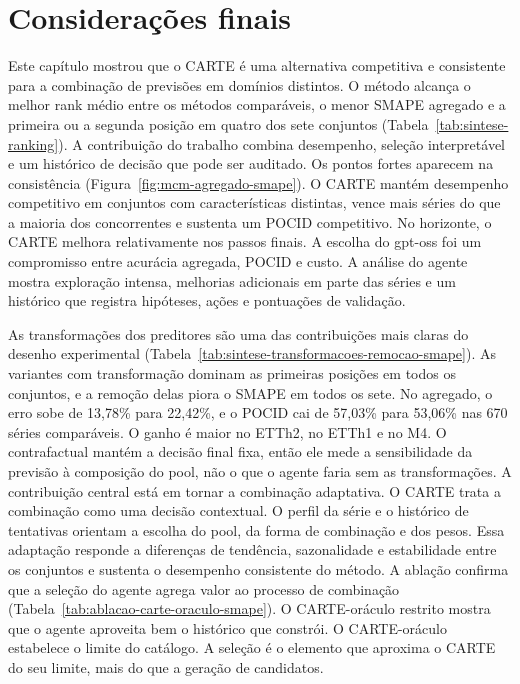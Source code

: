 \section{Considerações finais}
Este capítulo mostrou que o CARTE é uma alternativa competitiva e consistente para a combinação de previsões em domínios distintos. O método alcança o melhor rank médio entre os métodos comparáveis, o menor SMAPE agregado e a primeira ou a segunda posição em quatro dos sete conjuntos (Tabela~\ref{tab:sintese-ranking}). A contribuição do trabalho combina desempenho, seleção interpretável e um histórico de decisão que pode ser auditado. Os pontos fortes aparecem na consistência (Figura~\ref{fig:mcm-agregado-smape}). O CARTE mantém desempenho competitivo em conjuntos com características distintas, vence mais séries do que a maioria dos concorrentes e sustenta um POCID competitivo. No horizonte, o CARTE melhora relativamente nos passos finais. A escolha do gpt-oss foi um compromisso entre acurácia agregada, POCID e custo. A análise do agente mostra exploração intensa, melhorias adicionais em parte das séries e um histórico que registra hipóteses, ações e pontuações de validação.

As transformações dos preditores são uma das contribuições mais claras do desenho experimental (Tabela~\ref{tab:sintese-transformacoes-remocao-smape}). As variantes com transformação dominam as primeiras posições em todos os conjuntos, e a remoção delas piora o SMAPE em todos os sete. No agregado, o erro sobe de 13,78\% para 22,42\%, e o POCID cai de 57,03\% para 53,06\% nas 670 séries comparáveis. O ganho é maior no ETTh2, no ETTh1 e no M4. O contrafactual mantém a decisão final fixa, então ele mede a sensibilidade da previsão à composição do pool, não o que o agente faria sem as transformações. A contribuição central está em tornar a combinação adaptativa. O CARTE trata a combinação como uma decisão contextual. O perfil da série e o histórico de tentativas orientam a escolha do pool, da forma de combinação e dos pesos. Essa adaptação responde a diferenças de tendência, sazonalidade e estabilidade entre os conjuntos e sustenta o desempenho consistente do método. A ablação confirma que a seleção do agente agrega valor ao processo de combinação (Tabela~\ref{tab:ablacao-carte-oraculo-smape}). O CARTE-oráculo restrito mostra que o agente aproveita bem o histórico que constrói. O CARTE-oráculo estabelece o limite do catálogo. A seleção é o elemento que aproxima o CARTE do seu limite, mais do que a geração de candidatos.

